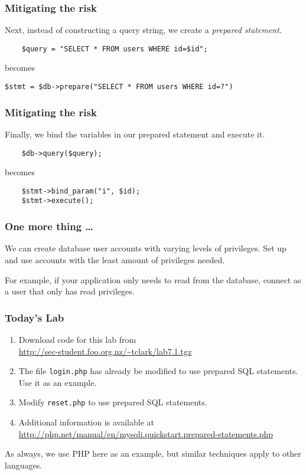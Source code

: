 \documentclass[10pt]{beamer}
\begin{document}
\begin{frame}[fragile]
	\frametitle{Mitigating the risk}
	
	Next, instead of constructing a query string, we create a \emph{prepared statement}.
	
	\begin{verbatim}
	$query = "SELECT * FROM users WHERE id=$id";
	\end{verbatim}
	
	becomes
	
	\begin{verbatim}
$stmt = $db->prepare("SELECT * FROM users WHERE id=?")
	\end{verbatim}
	
	
	
	
\end{frame}

\begin{frame}[fragile]
	\frametitle{Mitigating the risk}
	
	Finally, we bind the variables in our prepared statement and execute it.
	
	\begin{verbatim}
	$db->query($query);
	\end{verbatim}
	
	becomes
	
	\begin{verbatim}
	$stmt->bind_param("i", $id);
	$stmt->execute();
	\end{verbatim}
	
\end{frame}

\begin{frame}
	\frametitle{One more thing \ldots}
	
	We can create database user accounts with varying levels of privileges. Set up and use accounts with the least amount of privileges needed.
	\vspace{5mm}
	
	For example, if your application only needs to read from the database, connect as a user that only has read privileges.
\end{frame}

\begin{frame}
	\frametitle{Today's Lab}
	
	\begin{enumerate}
		\item Download code for this lab from \\
		\url{http://sec-student.foo.org.nz/~tclark/lab7.1.tgz}
		\item The file \texttt{login.php} has already be modified to use
		prepared SQL statements. Use it as an example.
		\item Modify \texttt{reset.php} to use prepared SQL statements.
		\item Additional information is available at \\ 
		\url{http://php.net/manual/en/mysqli.quickstart.prepared-statements.php}
	\end{enumerate}
	
	As always, we use PHP here as an example, but similar techniques apply to other languages.
		
	
	\end{frame}
	
\end{document}
